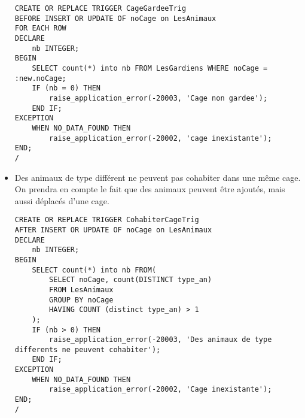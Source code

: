 \documentclass{article}
\begin{document}
\begin{itemize}
\begin{lstlisting}
CREATE OR REPLACE TRIGGER CageGardeeTrig
BEFORE INSERT OR UPDATE OF noCage on LesAnimaux
FOR EACH ROW
DECLARE
	nb INTEGER;
BEGIN
	SELECT count(*) into nb FROM LesGardiens WHERE noCage = :new.noCage;
	IF (nb = 0) THEN
		raise_application_error(-20003, 'Cage non gardee');
	END IF;
EXCEPTION 
	WHEN NO_DATA_FOUND THEN
		raise_application_error(-20002, 'cage inexistante');
END;
/
\end{lstlisting}
	\item Des animaux de type différent ne peuvent pas cohabiter dans une même cage. On prendra en
compte le fait que des animaux peuvent être ajoutés, mais aussi déplacés d’une cage.
\begin{lstlisting}
CREATE OR REPLACE TRIGGER CohabiterCageTrig
AFTER INSERT OR UPDATE OF noCage on LesAnimaux
DECLARE
	nb INTEGER;
BEGIN
	SELECT count(*) into nb FROM(
		SELECT noCage, count(DISTINCT type_an)
		FROM LesAnimaux
		GROUP BY noCage
		HAVING COUNT (distinct type_an) > 1
	);
	IF (nb > 0) THEN
		raise_application_error(-20003, 'Des animaux de type differents ne peuvent cohabiter');
	END IF;
EXCEPTION 
	WHEN NO_DATA_FOUND THEN
		raise_application_error(-20002, 'Cage inexistante');
END;
/
\end{lstlisting}
\end{itemize}
\end{document}
